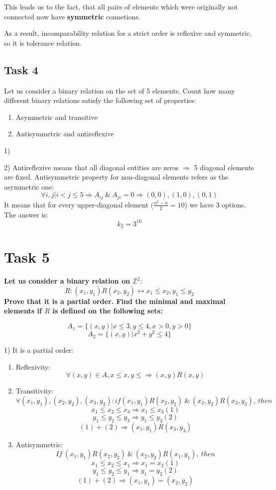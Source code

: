 This leads us to the fact, that all pairs of elements which were originally not connected now have \textbf{symmetric} connetions.

As a result, incomparability relation for a strict order is reflexive and symmetric, so it is tolerance relation.
\subsection{Task 4}

Let us consider a binary relation on the set of 5 elements. Count how many different
binary relations satisfy the following set of properties:

\begin{enumerate}
\item Asymmetric and transitive
\item Antisymmetric and antireflexive
\end{enumerate}

1)

2) Antireflexive means that all diagonal entities are zeros $\Rightarrow$ 5 diagonal elements are fixed.
Antisymmetric property for non-diagonal elements refers as the asymmetric one:
\[  \forall i,j | i < j \leq 5 \Rightarrow A_{ij}\ \& \ A_{ji} = 0 \Rightarrow (0,0), (1,0), (0,1)  \]
It means that for every upper-diagonal element ($\frac{n^2-n}{2}=10$)  we have 3 options.
The answer is:
\[ k_2=3^{10} \]

\section{Task 5}

\begin{center}
\textbf{Let us consider a binary relation on $\mathbb{Z}^2$}:
\[ R : (x_1, y_1)R(x_2, y_2) \leftrightarrow x_1 \leq x_2, y_1 \leq y_2 \]
\textbf{Prove that it is a partial order.
Find the minimal and maximal elements if $R$ is defined on the following sets:}

\[ A_1 = \{ (x,y) | x \leq 3, y \leq 4, x > 0, y > 0 \} \]
\[ A_2 = \{ (x,y) | x^2 + y^2 \leq 4 \} \]
\end{center}

1) It is a partial order:

\begin{enumerate}
\item Reflexivity:
\[ \forall (x,y) \in A, x \leq x, y \leq \Rightarrow (x,y)R(x,y) \]
\item Transitivity:
\[ \forall (x_1, y_1), (x_2, y_2), (x_3, y_3): if (x_1,y_1)R(x_2,y_2)\ \& \ (x_2,y_2)R(x_3,y_3),\ then \]
\[ x_1 \leq x_2 \leq x_3 \Rightarrow x_1 \leq x_3 (1)\]
\[ y_1 \leq y_2 \leq y_3 \Rightarrow y_1 \leq y_3 (2)\]
\[ (1) + (2) \Rightarrow (x_1,y_1)R(x_3,y_3)\] 
\item Antisymmetric:
\[ If\ (x_1,y_1)R(x_2,y_2)\ \& \ (x_2,y_2)R(x_1,y_1),\ then \]
\[ x_1 \leq x_2 \leq x_1 \Rightarrow x_1=x_2 (1) \]
\[ y_1 \leq y_2 \leq y_1 \Rightarrow y_1=y_2 (2) \]
\[ (1)+(2) \Rightarrow (x_1,y_1) = (x_2, y_2) \]
\end{enumerate}

